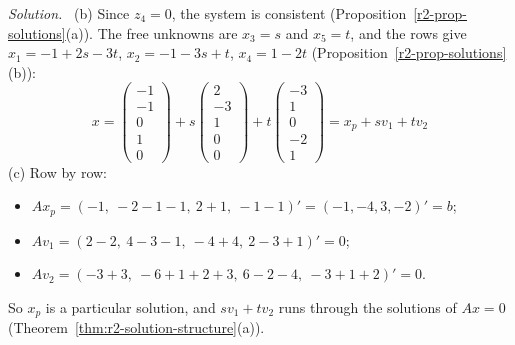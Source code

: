 \documentclass[12pt]{article}
\theoremstyle{definition}
\newenvironment{solution}{\par\noindent\textit{Solution.}\ }{\par\smallskip}
\begin{document}
\begin{solution}
(b) Since \(z_4=0\), the system is consistent (Proposition~\ref{r2-prop-solutions}(a)). The free unknowns are
\(x_3=s\) and \(x_5=t\), and the rows give \(x_1=-1+2s-3t\), \(x_2=-1-3s+t\), \(x_4=1-2t\)
(Proposition~\ref{r2-prop-solutions}(b)):
\[
x=\begin{pmatrix}-1\\-1\\0\\1\\0\end{pmatrix}+s\begin{pmatrix}2\\-3\\1\\0\\0\end{pmatrix}+t\begin{pmatrix}-3\\1\\0\\-2\\1\end{pmatrix}
=x_p+sv_1+tv_2
\]
(c) Row by row:
\begin{itemize}
\item \(Ax_p=(-1,\ -2-1-1,\ 2+1,\ -1-1)'=(-1,-4,3,-2)'=b\);
\item \(Av_1=(2-2,\ 4-3-1,\ -4+4,\ 2-3+1)'=0\);
\item \(Av_2=(-3+3,\ -6+1+2+3,\ 6-2-4,\ -3+1+2)'=0\).
\end{itemize}
So \(x_p\) is a particular solution, and \(sv_1+tv_2\) runs through the solutions of \(Ax=0\)
(Theorem~\ref{thm:r2-solution-structure}(a)).
\end{solution}
\end{document}
